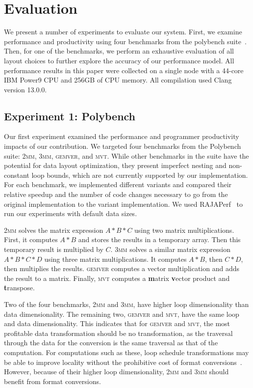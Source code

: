 \documentclass[sigconf,review=true]{acmart}
\begin{document}
\section{Evaluation}

We present a number of experiments to evaluate our system. 
First, we examine performance and productivity using four benchmarks from the polybench suite~\cite{pouchet2012polybench}.
Then, for one of the benchmarks, we perform an exhaustive evaluation of all layout choices to further explore the accuracy of our performance model.
All performance results in this paper were collected on a single node with a 44-core IBM Power9 CPU and 256GB of CPU memory.
All compilation used Clang version 13.0.0.

\subsection{Experiment 1: Polybench}

Our first experiment examined the performance and programmer productivity impacts of our contribution.
We targeted four benchmarks from the Polybench suite: \textsc{2mm}, \textsc{3mm}, \textsc{gemver}, and \textsc{mvt}.
While other benchmarks in the suite have the potential for data layout optimization, they present imperfect nesting and non-constant loop bounds, which are not currently supported by our implementation. 
For each benchmark, we implemented different variants and compared their relative speedup and the number of code changes necessary to go from the original implementation to the variant implementation.
We used RAJAPerf~\cite{hornung2017raja} to run our experiments with default data sizes.

\textsc{2mm} solves the matrix expression $A*B*C$ using two matrix multiplications. 
First, it computes $A*B$ and stores the results in a temporary array.
Then this temporary result is multiplied by $C$.
\textsc{3mm} solves a similar matrix expression $A*B*C*D$ using three matrix multiplications.
It computes $A*B$, then $C*D$, then multiplies the results.
\textsc{gemver} computes a vector multiplication and adds the result to a matrix. 
Finally, \textsc{mvt} computes a \textbf{m}atrix \textbf{v}ector product and \textbf{t}ranspose.

Two of the four benchmarks, \textsc{2mm} and \textsc{3mm}, have higher loop dimensionality than data dimensionality. 
The remaining two, \textsc{gemver} and \textsc{mvt}, have the same loop and data dimensionality. 
This indicates that for \textsc{gemver} and \textsc{mvt}, the most profitable data transformation should be no transformation, as the traversal through the data for the conversion is the same traversal as that of the computation.
For computations such as these, loop schedule transformations may be able to improve locality without the prohibitive cost of format conversions~\cite{kandemir1998improving}.
However, because of their higher loop dimensionality, \textsc{2mm} and \textsc{3mm} should benefit from format conversions.
\end{document}
